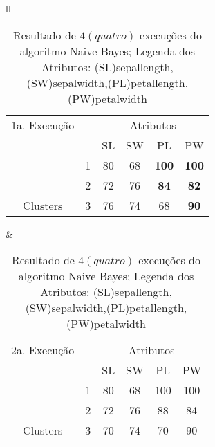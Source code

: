 \begin{table}[!h]
\caption{Resultado de ${4(quatro)}$ execuções do algoritmo Naive Bayes; Legenda dos Atributos: (SL)sepallength,(SW)sepalwidth,(PL)petallength,(PW)petalwidth}
 \begin{tabular}{ll}

  
   \small\addtolength{\tabcolsep}{-1pt}
     \begin{tabular}{|cl|c|c|c|c|}
        \hline \hline
                  1a. Execução   &   & \multicolumn{4}{c|}{Atributos}                                               \\ \cline{3-6} 
       \multicolumn{1}{|l}{}                             &   & SL   & SW     & PL    & PW      \\ \hline
        \multicolumn{1}{|c|}{}                           & 1 & 80   & 68     & \textbf{100}   & \textbf{100}       \\ \cline{2-6} 
        \multicolumn{1}{|c|}{}                           & 2 & 72 & 76   & \textbf{84}  & \textbf{82}     \\ \cline{2-6} 
        \multicolumn{1}{|c|}{\multirow{-3}{*}{Clusters}} & 3 & 76 & 74   & 68  & \textbf{90}     \\ \hline
      \end{tabular}
 &
 
   
  \small\addtolength{\tabcolsep}{-1pt}
     \begin{tabular}{|cl|c|c|c|c|}
        \hline \hline
         2a. Execução         &   & \multicolumn{4}{c|}{Atributos}                                               \\ \cline{3-6} 
       \multicolumn{1}{|l}{}                             &   & SL   & SW     & PL    & PW      \\ \hline
        \multicolumn{1}{|c|}{}                           & 1 & 80 & 68   & 100 &  100      \\ \cline{2-6} 
        \multicolumn{1}{|c|}{}                           & 2 & 72 & 76   & 88  &    84  \\ \cline{2-6} 
        \multicolumn{1}{|c|}{\multirow{-3}{*}{Clusters}} & 3 & 70 & 74   & 70  &  90    \\ \hline
      \end{tabular}
  \\  [8ex]
 

\end{tabular}
\end{table}
